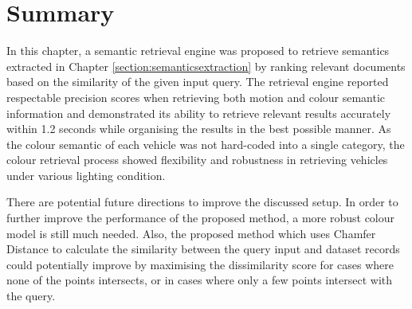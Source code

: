 

\section{Summary}

In this chapter, a semantic retrieval engine was proposed to retrieve semantics extracted in Chapter \ref{section:semanticsextraction} by ranking relevant documents based on the similarity of the given input query.
The retrieval engine reported respectable precision scores when retrieving both motion and colour semantic information and demonstrated its ability to retrieve relevant results accurately within 1.2 seconds while organising the results in the best possible manner. As the colour semantic of each vehicle was not hard-coded into a single category, the colour retrieval process showed flexibility and robustness in retrieving vehicles under various lighting condition.

There are potential future directions to improve the discussed setup. In order to further improve the performance of the proposed method, a more robust colour model is still much needed. Also, the proposed method which
uses Chamfer Distance to calculate the similarity between the query input and dataset records could potentially improve by maximising the dissimilarity score for cases where none of the points intersects, or in cases where only a few points intersect with the query.


